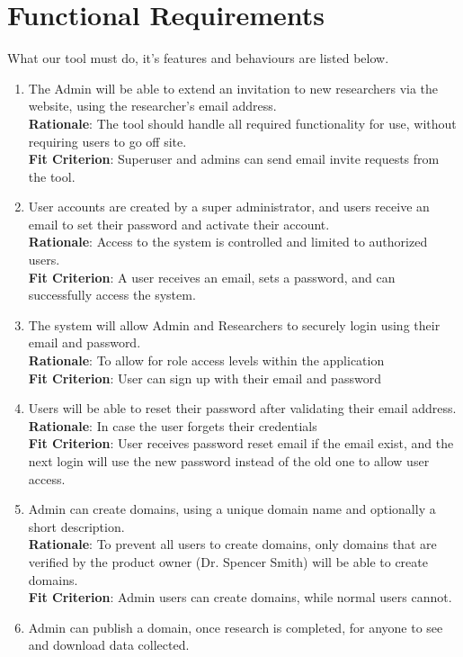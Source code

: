\documentclass[12pt]{article}
\begin{document}
\section{Functional Requirements}
What our tool must do, it's features and behaviours are listed below.
\begin{enumerate}[label=FR\arabic*]
  \item The Admin will be able to extend an invitation to new researchers via the website, using the researcher's email address.
  \\ \textbf{Rationale}: The tool should handle all required functionality for use, without requiring users to go off site.
  \\ \textbf{Fit Criterion}: Superuser and admins can send email invite requests from the tool.
    \item User accounts are created by a super administrator, and users receive an email to set their password and activate their account.
\\ \textbf{Rationale}: Access to the system is controlled and limited to authorized users.
\\ \textbf{Fit Criterion}: A user receives an email, sets a password, and can successfully access the system.
  \item The system will allow Admin and Researchers to securely login using their email and password.
  \\ \textbf{Rationale}: To allow for role access levels within the application
  \\ \textbf{Fit Criterion}: User can sign up with their email and password
  \item Users will be able to reset their password after validating their email address.
  \\ \textbf{Rationale}: In case the user forgets their credentials
  \\ \textbf{Fit Criterion}: User receives password reset email if the email exist, and the next login will use the new password instead of the old one to allow user access.
  \item Admin can create domains, using a unique domain name and optionally a short description.
  \\ \textbf{Rationale}: To prevent all users to create domains, only domains that are verified by the product owner (Dr. Spencer Smith) will be able to create domains.
  \\ \textbf{Fit Criterion}: Admin users can create domains, while normal users cannot.
  \item Admin can publish a domain, once research is completed, for anyone to see and download data collected.

\end{enumerate}
\end{document}

